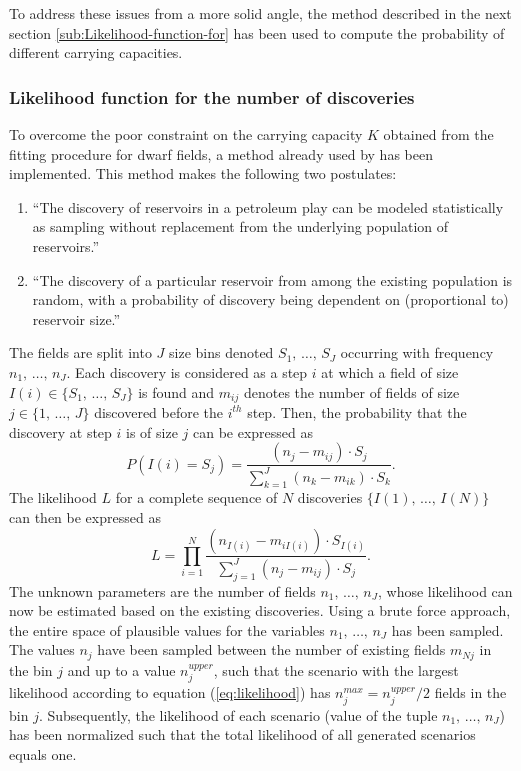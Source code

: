 \documentclass[review]{elsarticle}
\begin{document}
To address these issues from a more solid angle, the method
described in the next section \ref{sub:Likelihood-function-for} has been used
to compute the probability of different carrying capacities.


\subsubsection{Likelihood function for the number of discoveries\label{sub:Likelihood-function-for}}

To overcome the poor constraint on the carrying capacity
$K$ obtained from the fitting procedure for dwarf fields, a method
already used by \cite{Smith1980} has been implemented. This
method makes the following two postulates:
\begin{enumerate}
\item ``The discovery of reservoirs in a petroleum play can be modeled
statistically as sampling without replacement from the underlying
population of reservoirs.''
\item ``The discovery of a particular reservoir from among the existing
population is random, with a probability of discovery being dependent 
on (proportional to) reservoir size.''
\end{enumerate}
The fields are split into $J$ size bins denoted $S_{1},\,\ldots,\, S_{J}$
occurring with frequency $n_{1},\,\ldots,\, n_{J}$. Each discovery
is considered as a step $i$ at which a field of size $I(i)\in\{S_{1},\,\ldots,\, S_{J}\}$
is found and $m_{ij}$ denotes the number of fields of size $j\in\{1,\,\ldots,\, J\}$
discovered before the $i^{th}$ step. Then, the probability that the
discovery at step $i$ is of size $j$ can be expressed as
\begin{equation}
P\left(I(i)=S_{j}\right)=\frac{\left(n_{j}-m_{ij}\right)\cdot S_{j}}{\sum_{k=1}^{J}\left(n_{k}-m_{ik}\right)\cdot S_{k}}.
\end{equation}
The likelihood $L$ for a complete sequence of $N$ discoveries $\{I(1),\,\ldots,\, I(N)\}$
can then be expressed as
\begin{equation}
L=\prod_{i=1}^{N}\frac{\left(n_{I(i)}-m_{iI(i)}\right)\cdot S_{I(i)}}{\sum_{j=1}^{J}\left(n_{j}-m_{ij}\right)\cdot S_{j}}.\label{eq:likelihood}
\end{equation}
The unknown parameters are the number of fields $n_{1},\,\ldots,\, n_{J}$,
whose likelihood can now be estimated based on the existing discoveries.
Using a brute force approach, the entire space of plausible values
for the variables $n_{1},\,\ldots,\, n_{J}$ has been sampled. The
values $n_{j}$ have been sampled between the number of existing fields
$m_{Nj}$ in the bin $j$ and up to a value $n_{j}^{upper}$, such
that the scenario with the largest likelihood according to equation
(\ref{eq:likelihood}) has $n_{j}^{max}=n_{j}^{upper}/2$ fields in
the bin $j$. Subsequently, the likelihood of each scenario (value
of the tuple $n_{1},\,\ldots,\, n_{J}$) has been normalized such
that the total likelihood of all generated scenarios equals one.
\end{document}
